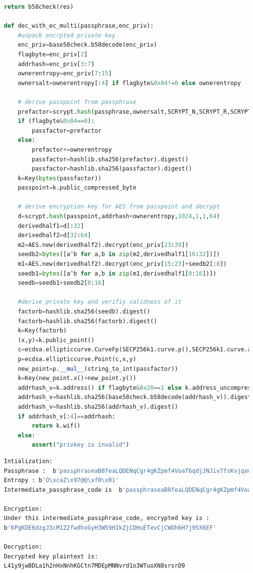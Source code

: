 \begin{lstlisting}[language=python, caption = Encryption \& Decryption with EC mutiplication, 
label=lst-baddersig]
	return b58check(res)

def dec_with_ec_multi(passphrase,enc_priv):
	#unpack encrpted private key
	enc_priv=base58check.b58decode(enc_priv)
	flagbyte=enc_priv[2]
	addrhash=enc_priv[3:7]
	ownerentropy=enc_priv[7:15]
	ownersalt=ownerentropy[:4] if flagbyte&0x04!=0 else ownerentropy
		
	# derive passpoint from passphrase
	prefactor=scrypt.hash(passphrase,ownersalt,SCRYPT_N,SCRYPT_R,SCRYPT_P,32)
	if (flagbyte&0x04==0):
		passfactor=prefactor
	else:			
		prefactor+=ownerentropy
		passfactor=hashlib.sha256(prefactor).digest()
		passfactor=hashlib.sha256(passfactor).digest()
	k=Key(bytes(passfactor))
	passpoint=k.public_compressed_byte

	# derive encryption key for AES from passpoint and decrypt
	d=scrypt.hash(passpoint,addrhash+ownerentropy,1024,1,1,64)
	derivedhalf1=d[:32]
	derivedhalf2=d[32:64]
	m2=AES.new(derivedhalf2).decrypt(enc_priv[23:39])
	seedb2=bytes([a^b for a,b in zip(m2,derivedhalf1[16:32])])
	m1=AES.new(derivedhalf2).decrypt(enc_priv[15:23]+seedb2[:8])
	seedb1=bytes([a^b for a,b in zip(m1,derivedhalf1[0:16])])
	seedb=seedb1+seedb2[8:16]

	#derive private key and verifiy validness of it
	factorb=hashlib.sha256(seedb).digest()
	factorb=hashlib.sha256(factorb).digest()
	k=Key(factorb)
	(x,y)=k.public_point()
	c=ecdsa.ellipticcurve.CurveFp(SECP256k1.curve.p(),SECP256k1.curve.a(),SECP256k1.curve.b())
	p=ecdsa.ellipticcurve.Point(c,x,y)
	new_point=p.__mul__(string_to_int(passfactor))
	k=Key(new_point.x()+new_point.y())
	addrhash_v=k.address() if flagbyte&0x20==1 else k.address_uncompressed()
	addrhash_v=hashlib.sha256(base58check.b58decode(addrhash_v)).digest()
	addrhash_v=hashlib.sha256(addrhash_v).digest()
	if addrhash_v[:4]==addrhash:
		return k.wif()
	else:
		assert("privkey is invalid")
\end{lstlisting}


\begin{lstlisting}[language=bash, caption = 测试结果, label=lst-baddersig]
Intialization:
Passphrase :  b'passphraseaB8feaLQDENqCgr4gKZpmf4VoaT6qdjJNJiv7fsKvjqavcJxvuR1hy25aTu5sX'
Entropy : b'O\xcaZ\x97@@\xf0\x01'
Intermediate_passphrase_code is  b'passphraseaB8feaLQDENqCgr4gKZpmf4VoaT6qdjJNJiv7fsKvjqavcJxvuR1hy25aTu5sX'

Encryption:
Under this intermediate_passphrase_code, encrypted key is :
b'6PgKDE6dzgJ3cM1Z2fwdhxGyH3W59H1kZjCDHuETevCjCWDh6H7j95X6EF'

Decryption:
Decrypted key plaintext is:
L41y9jwBDLa1h2nHxNnhKGCtn7MDEpMNNvrd1o3WTuoXN8srsrD9
\end{lstlisting}

